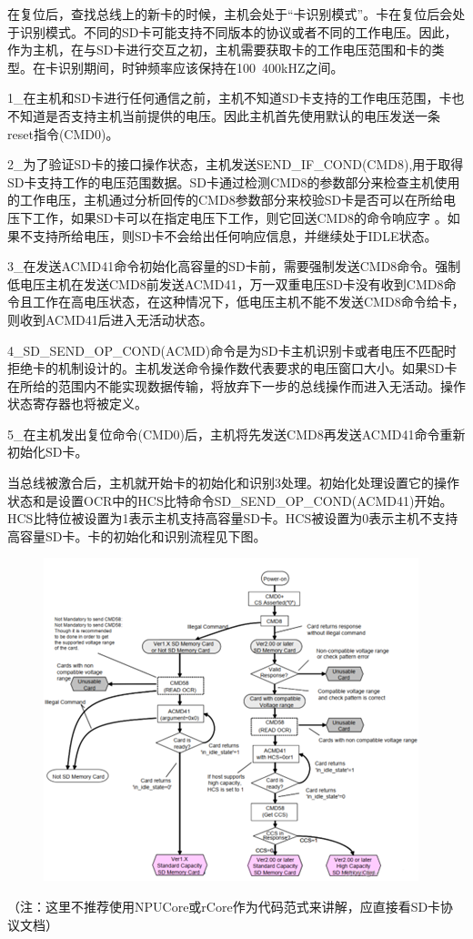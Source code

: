 在复位后，查找总线上的新卡的时候，主机会处于“卡识别模式”。卡在复位后会处于识别模式。不同的SD卡可能支持不同版本的协议或者不同的⼯作电压。因此，作为主机，在与SD卡进行交互之初，主机需要获取卡的工作电压范围和卡的类型。在卡识别期间，时钟频率应该保持在100~400kHZ之间。

1_在主机和SD卡进行任何通信之前，主机不知道SD卡支持的工作电压范围，卡也不知道是否支持主机当前提供的电压。因此主机首先使用默认的电压发送一条reset指令(CMD0)。

2_为了验证SD卡的接口操作状态，主机发送SEND_IF_COND(CMD8),用于取得SD卡支持工作的电压范围数据。SD卡通过检测CMD8的参数部分来检查主机使用的工作电压，主机通过分析回传的CMD8参数部分来校验SD卡是否可以在所给电压下工作，如果SD卡可以在指定电压下工作，则它回送CMD8的命令响应字 。如果不支持所给电压，则SD卡不会给出任何响应信息，并继续处于IDLE状态。

3_在发送ACMD41命令初始化高容量的SD卡前，需要强制发送CMD8命令。强制低电压主机在发送CMD8前发送ACMD41，万一双重电压SD卡没有收到CMD8命令且工作在高电压状态，在这种情况下，低电压主机不能不发送CMD8命令给卡，则收到ACMD41后进入无活动状态。

4_SD_SEND_OP_COND(ACMD)命令是为SD卡主机识别卡或者电压不匹配时拒绝卡的机制设计的。主机发送命令操作数代表要求的电压窗口大小。如果SD卡在所给的范围内不能实现数据传输，将放弃下一步的总线操作而进入无活动。操作状态寄存器也将被定义。

5_在主机发出复位命令(CMD0)后，主机将先发送CMD8再发送ACMD41命令重新初始化SD卡。

当总线被激合后，主机就开始卡的初始化和识别3处理。初始化处理设置它的操作状态和是设置OCR中的HCS比特命令SD_SEND_OP_COND(ACMD41)开始。HCS比特位被设置为1表示主机支持高容量SD卡。HCS被设置为0表示主机不支持高容量SD卡。卡的初始化和识别流程见下图。
\begin{figure}[H]
    \centering
    \includegraphics{figures/06-02-初始化.png}
\end{figure}
（注：这里不推荐使用NPUCore或rCore作为代码范式来讲解，应直接看SD卡协议文档）

